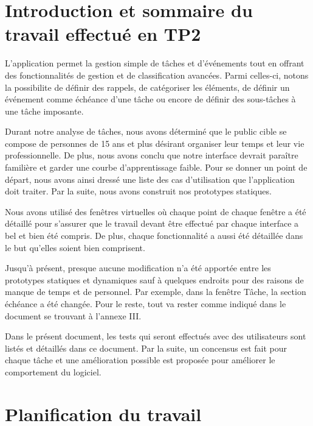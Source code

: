 \documentclass[letterpaper, oneside, 12pt, these, creativecommons]{thETS}
\begin{document}
\chapter{Introduction et sommaire du travail effectué en TP2}

L'application permet la gestion simple de tâches et d'événements tout en offrant des fonctionnalités de gestion et de classification avancées. Parmi celles-ci, notons la possibilite de définir des rappels, de catégoriser les éléments, de définir un événement comme échéance d'une tâche ou encore de définir des sous-tâches à une tâche imposante.

Durant notre analyse de tâches, nous avons déterminé que le public cible se compose de personnes de 15 ans et plus désirant organiser leur temps et leur vie professionnelle. De plus, nous avons conclu que notre interface devrait paraître familière et garder une courbe d'apprentissage faible. Pour se donner un point de départ, nous avons ainsi dressé une liste des cas d'utilisation que l'application doit traiter. Par la suite, nous avons construit nos prototypes statiques.

Nous avons utilisé des fenêtres virtuelles où chaque point de chaque fenêtre a été détaillé pour s'assurer que le travail devant être effectué par chaque interface a bel et bien été compris. De plus, chaque fonctionnalité a aussi été détaillée dans le but qu'elles soient bien comprisent.

Jusqu'à présent, presque aucune modification n'a été apportée entre les prototypes statiques et dynamiques sauf à quelques endroits pour des raisons de manque de temps et de personnel. Par exemple, dans la fenêtre Tâche, la section échéance a été changée. Pour le reste, tout va rester comme indiqué dans le document se trouvant à l'annexe III.

Dans le présent document, les tests qui seront effectués avec des utilisateurs sont listés et détaillés dans ce document. Par la suite, un concensus est fait pour chaque tâche et une amélioration possible est proposée pour améliorer le comportement du logiciel.

\chapter{Planification du travail}
\end{document}
